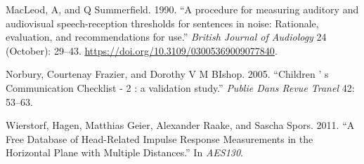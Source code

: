 \documentclass[a4paper,nobind]{templates/ociamthesis}
\newcommand*{\bibtitle}{References}
\begin{document}
\begin{cslreferences}
\leavevmode\hypertarget{ref-MacLeod1990}{}%
MacLeod, A, and Q Summerfield. 1990. ``A procedure for measuring auditory and audiovisual speech-reception thresholds for sentences in noise: Rationale, evaluation, and recommendations for use.'' \emph{British Journal of Audiology} 24 (October): 29--43. \url{https://doi.org/10.3109/03005369009077840}.

\leavevmode\hypertarget{ref-Norbury2005}{}%
Norbury, Courtenay Frazier, and Dorothy V M BIshop. 2005. ``Children ' s Communication Checklist - 2 : a validation study.'' \emph{Publie Dans Revue Tranel} 42: 53--63.

\leavevmode\hypertarget{ref-Wierstorf2011}{}%
Wierstorf, Hagen, Matthias Geier, Alexander Raake, and Sascha Spors. 2011. ``A Free Database of Head-Related Impulse Response Measurements in the Horizontal Plane with Multiple Distances.'' In \emph{AES130}.
\end{cslreferences}




\setlength{\baselineskip}{0pt} %

{\renewcommand*\MakeUppercase[1]{#1}%
\printbibliography[heading=bibintoc,title={\bibtitle}]}
\end{document}
